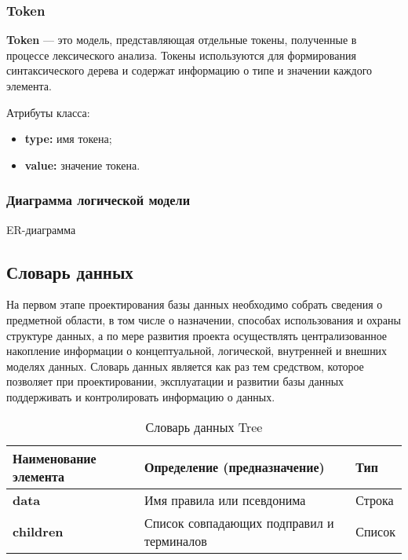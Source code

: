 \subsubsection{Token}

\textbf{Token} --- это модель, представляющая отдельные токены,
полученные в процессе лексического анализа.
Токены используются для формирования синтаксического дерева
и содержат информацию о типе и значении каждого элемента.

Атрибуты класса:

\begin{itemize}
	\item \textbf{type:} имя токена;
	\item \textbf{value:} значение токена.
\end{itemize}

\subsubsection{Диаграмма логической модели}

\begin{image}
	\caption{ER-диаграмма}
	\label{fig:er}
\end{image}

\subsection{Словарь данных}

На первом этапе проектирования базы данных необходимо собрать сведения о
предметной области, в том числе о назначении, способах использования и охраны
структуре данных, а по мере развития проекта осуществлять централизованное
накопление информации о концептуальной, логической, внутренней и внешних
моделях данных. Словарь данных является как раз тем средством, которое
позволяет при проектировании, эксплуатации и развитии базы данных
поддерживать и контролировать информацию о данных.

\begin{longtable}{|p{3.5cm}|p{5cm}|p{5cm}|}
	\caption{Словарь данных Tree} \\
	\hline
	\textbf{Наименование элемента}
	& \textbf{Определение (предназначение)}
	& \textbf{Тип} \\
	\hline
	\endhead
	\textbf{data} & Имя правила или псевдонима & Строка \\ \hline
	\textbf{children}
	& Список совпадающих подправил и терминалов
	& Список \\ \hline
\end{longtable}

